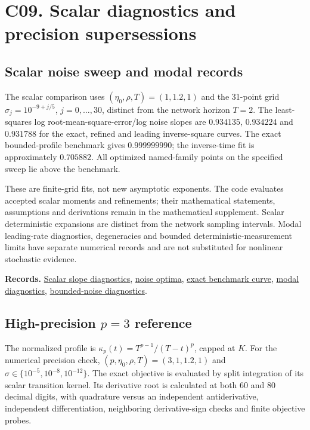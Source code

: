 \documentclass[11pt,a4paper]{article}
\begin{document}
\section{C09. Scalar diagnostics and precision supersessions}\label{c09}

\subsection{Scalar noise sweep and modal records}\label{c09-scalar}

The scalar comparison uses \((\eta_0,\rho,T)=(1,1.2,1)\) and the
31-point grid \(\sigma_j=10^{-9+j/5}\), \(j=0,\ldots,30\), distinct from
the network horizon \(T=2\). The least-squares log
root-mean-square-error/log noise slopes are \(0.934135\), \(0.934224\)
and \(0.931788\) for the exact, refined and leading inverse-square
curves. The exact bounded-profile benchmark gives \(0.999999990\); the
inverse-time fit is approximately \(0.705882\). All optimized
named-family points on the specified sweep lie above the benchmark.

These are finite-grid fits, not new asymptotic exponents. The code
evaluates accepted scalar moments and refinements; their mathematical
statements, assumptions and derivations remain in the mathematical
supplement. Scalar deterministic expansions are distinct from the
network sampling intervals. Modal leading-rate diagnostics, degeneracies
and bounded deterministic-measurement limits have separate numerical
records and are not substituted for nonlinear stochastic evidence.

\textbf{Records.}
\href{../data/records/modal_lambert_remainder_and_slopes.csv}{Scalar
slope diagnostics},
\href{../data/records/schedule_noise_optima.csv}{noise optima},
\href{../data/records/dirichlet_envelope_curves.csv}{exact benchmark
curve}, \href{../data/records/modal_asymptotics.csv}{modal diagnostics},
\href{../data/records/modal_bounded_noise_limits.csv}{bounded-noise
diagnostics}.

\subsection{\texorpdfstring{High-precision \(p=3\)
reference}{High-precision p=3 reference}}\label{c09-power}

The normalized profile is \(\kappa_p(t)=T^{p-1}/(T-t)^p\), capped at
\(K\). For the numerical precision check,
\((p,\eta_0,\rho,T)=(3,1,1.2,1)\) and
\(\sigma\in\{10^{-5},10^{-8},10^{-12}\}\). The exact objective is
evaluated by split integration of its scalar transition kernel. Its
derivative root is calculated at both 60 and 80 decimal digits, with
quadrature versus an independent antiderivative, independent
differentiation, neighboring derivative-sign checks and finite objective
probes.
\end{document}
